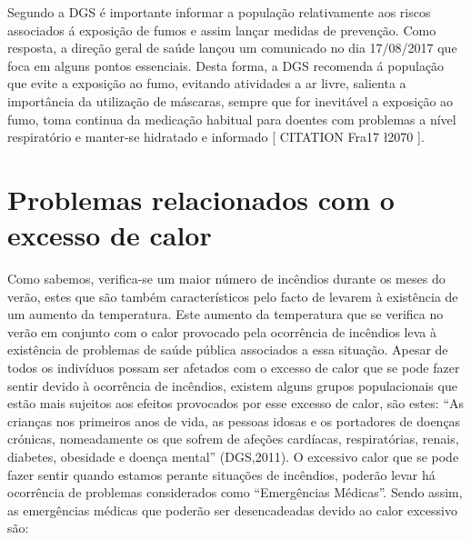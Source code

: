 \documentclass[a4paper,11pt]{report}
\begin{document}
Segundo a DGS é importante informar a população relativamente aos riscos associados á exposição de fumos e assim lançar medidas de prevenção. Como resposta, a direção geral de saúde lançou um comunicado no dia 17/08/2017 que foca em alguns pontos essenciais. Desta forma, a DGS recomenda á população que evite a exposição ao fumo, evitando atividades a ar livre, salienta a importância da utilização de máscaras, sempre que for inevitável a exposição ao fumo, toma continua da medicação habitual para doentes com problemas a nível respiratório e manter-se hidratado e informado [ CITATION Fra17 \l 2070 ].


\chapter{Problemas relacionados com o excesso de calor}
Como sabemos, verifica-se um maior número de incêndios durante os meses do verão, estes que são também característicos pelo facto de levarem à existência de um aumento da temperatura. Este aumento da temperatura que se verifica no verão em conjunto com o calor provocado pela ocorrência de incêndios leva à existência de problemas de saúde pública associados a essa situação.
Apesar de todos os indivíduos possam ser afetados com o excesso de calor que se pode fazer sentir devido à ocorrência de incêndios, existem alguns grupos populacionais que estão mais sujeitos aos efeitos provocados por esse excesso de calor, são estes: “As crianças nos primeiros anos de vida, as pessoas idosas e os portadores de doenças crónicas, nomeadamente os que sofrem de afeções cardíacas, respiratórias, renais, diabetes, obesidade e doença mental” (DGS,2011).
O excessivo calor que se pode fazer sentir quando estamos perante situações de incêndios, poderão levar há ocorrência de problemas considerados como “Emergências Médicas”. Sendo assim, as emergências médicas que poderão ser desencadeadas devido ao calor excessivo são:
\end{document}
